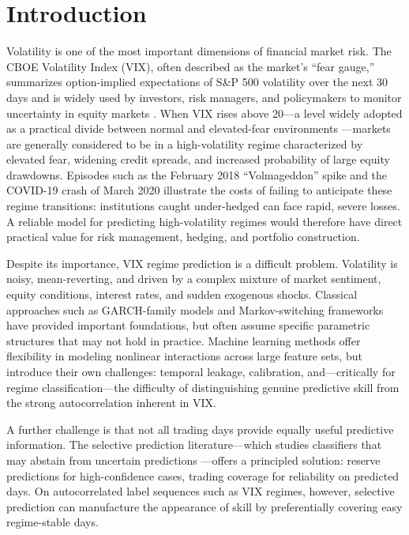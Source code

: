 \documentclass[11pt]{article}
\begin{document}
\tableofcontents
\newpage

\section{Introduction}

Volatility is one of the most important dimensions of financial market risk. The CBOE Volatility Index (VIX), often described as the market's ``fear gauge,'' summarizes option-implied expectations of S\&P 500 volatility over the next 30 days and is widely used by investors, risk managers, and policymakers to monitor uncertainty in equity markets \citep{whaley2009}. When VIX rises above 20---a level widely adopted as a practical divide between normal and elevated-fear environments \citep{whaley2009}---markets are generally considered to be in a high-volatility regime characterized by elevated fear, widening credit spreads, and increased probability of large equity drawdowns. Episodes such as the February 2018 ``Volmageddon'' spike and the COVID-19 crash of March 2020 illustrate the costs of failing to anticipate these regime transitions: institutions caught under-hedged can face rapid, severe losses. A reliable model for predicting high-volatility regimes would therefore have direct practical value for risk management, hedging, and portfolio construction.

Despite its importance, VIX regime prediction is a difficult problem. Volatility is noisy, mean-reverting, and driven by a complex mixture of market sentiment, equity conditions, interest rates, and sudden exogenous shocks. Classical approaches such as GARCH-family models \citep{bollerslev1986} and Markov-switching frameworks \citep{hamilton1989} have provided important foundations, but often assume specific parametric structures that may not hold in practice. Machine learning methods offer flexibility in modeling nonlinear interactions across large feature sets, but introduce their own challenges: temporal leakage, calibration, and---critically for regime classification---the difficulty of distinguishing genuine predictive skill from the strong autocorrelation inherent in VIX.

A further challenge is that not all trading days provide equally useful predictive information. The selective prediction literature---which studies classifiers that may abstain from uncertain predictions \citep{chow1970, bartlett2008, geifman2017}---offers a principled solution: reserve predictions for high-confidence cases, trading coverage for reliability on predicted days. On autocorrelated label sequences such as VIX regimes, however, selective prediction can manufacture the appearance of skill by preferentially covering easy regime-stable days.
\end{document}
